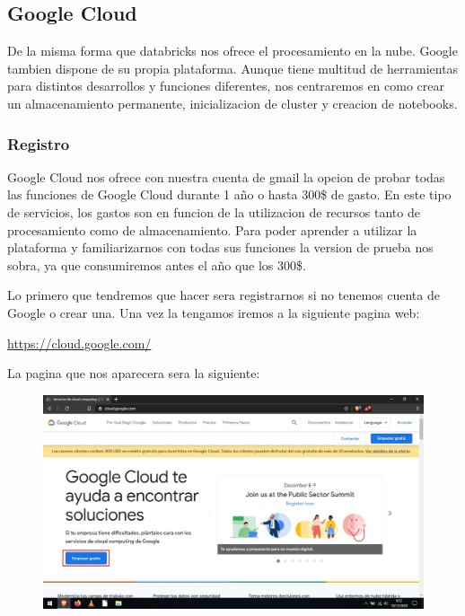 \documentclass[a4paper,10pt]{article}
\begin{document}
\subsection{Google Cloud}

De la misma forma que databricks nos ofrece el procesamiento en la nube. Google tambien dispone de su propia plataforma. Aunque tiene multitud de herramientas para distintos desarrollos y funciones diferentes, nos centraremos en como crear un almacenamiento permanente, inicializacion de cluster y creacion de notebooks.

\subsubsection{Registro}

Google Cloud nos ofrece con nuestra cuenta de gmail la opcion de probar todas las funciones de Google Cloud durante 1 año o hasta 300\$ de gasto. En este tipo de servicios, los gastos son en funcion de la utilizacion de recursos tanto de procesamiento como de almacenamiento. Para poder aprender a utilizar la plataforma y familiarizarnos con todas sus funciones la version de prueba nos sobra, ya que consumiremos antes el año que los 300\$.

Lo primero que tendremos que hacer sera registrarnos si no tenemos cuenta de Google o crear una. Una vez la tengamos iremos a la siguiente pagina web:

\begin{center}
\href{https://cloud.google.com/}{https://cloud.google.com/}
\end{center}

La pagina que nos aparecera sera la siguiente:

\begin{figure}[H]
\begin{center}
\includegraphics[width=500pt]{./fotos/GoogleCloud/1 - GC (V).jpg}
\end{center}
\end{figure}
\end{document}
